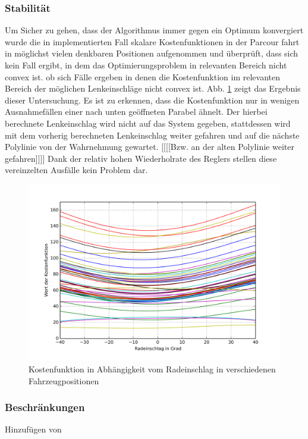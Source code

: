 \subsubsection{Stabilität}
Um Sicher zu gehen, dass der Algorithmus immer gegen ein Optimum konvergiert wurde die in implementierten Fall skalare Kostenfunktionen in der Parcour fahrt in möglichst vielen denkbaren Positionen aufgenommen und überprüft, dass sich kein Fall ergibt, in dem das Optimierungsproblem in relevanten Bereich nicht convex ist. ob sich Fälle ergeben in denen die Kostenfunktion im relevanten Bereich der möglichen Lenkeinschläge nicht convex ist. Abb. \ref{fig:parabel} zeigt das Ergebnis dieser Untersuchung. Es ist zu erkennen, dass die Kostenfunktion nur in wenigen Ausnahmefällen einer nach unten geöffneten Parabel ähnelt. Der hierbei berechnete Lenkeinschlag wird nicht auf das System gegeben, stattdessen wird mit dem vorherig berechneten Lenkeinschlag weiter gefahren und auf die nächste Polylinie von der Wahrnehmung gewartet. [[[[Bzw. an der alten Polylinie weiter gefahren]]]] Dank der relativ hohen Wiederholrate des Reglers stellen diese vereinzelten Ausfälle kein Problem dar.
\begin{figure}[t]
\centering
\includegraphics[scale=0.75]{Bilder/Parabeln.png}
\caption{Kostenfunktion in Abhängigkeit vom Radeinschlag in verschiedenen Fahrzeugpositionen}
\label{fig:parabel}
\end{figure}

\subsubsection{Beschränkungen}
Hinzufügen von ~
